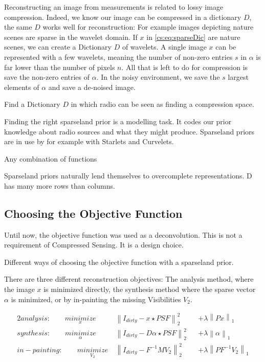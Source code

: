Reconstructing an image from measurements is related to lossy image compression. Indeed, we know our image can be compressed in a dictionary $D$, the same $D$ works well for reconstruction: For example images depicting nature scenes are sparse in the wavelet domain. If $x$ in \eqref{cs:eq:sparseDic} are nature scenes, we can create a Dictionary $D$ of wavelets. A single image $x$ can be represented with a few wavelets, meaning the number of non-zero entries $s$ in $\alpha$ is far lower than the number of pixels $n$. All that is left to do for compression is save the non-zero entries of $\alpha$. In the noisy environment, we save the $s$ largest elements of $\alpha$ and save a de-noised image.

Find a Dictionary $D$ in which radio can be seen as finding a compression space.


Finding the right sparseland prior is a modelling task. It codes our prior knowledge about radio sources and what they might produce. Sparseland priors are in use by for example with Starlets\cite{starck2015starlet} and Curvelets\cite{starck2003astronomical}. 

Any combination of functions

Sparseland priors naturally lend themselves to overcomplete representations. D has many more rows than columns.






\subsection{Choosing the Objective Function}
Until now, the objective function was used as a deconvolution. This is not a requirement of Compressed Sensing. It is a design choice.

Different ways of choosing the objective function with a sparseland prior.

There are three different reconstruction objectives: The analysis method, where the image $x$ is minimized directly, the synthesis method where the sparse vector $\alpha$ is minimized, or by in-painting the missing Visibilities $V_2$.

\begin{alignat*}{2}
analysis:\qquad \underset{x}{minimize} \:& \left \| I_{dirty} - x \star PSF \right \|_2^2 &&+  \lambda \left \| Px \right \|_1 \\
synthesis:\qquad \underset{\alpha}{minimize} \:& \left \| I_{dirty} - D \alpha \star PSF \right \|_2^2 &&+ \lambda \left \| \alpha \right \|_1 \\
in-painting:\qquad \underset{V_2}{minimize} \:& \left \|  I_{dirty} - F^{-1} M V_2 \right \|_2^2 &&+ \lambda \left \| PF^{-1}V_2\right \|_1
\end{alignat*}

